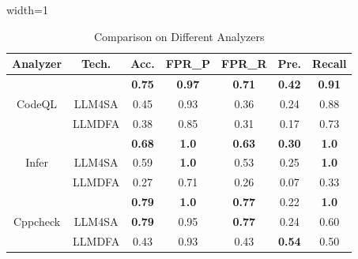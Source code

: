 \begin{table}[htb]
    \centering
    \caption{Comparison on Different Analyzers}\label{table:rq1_2}
    \footnotesize
    \begin{adjustbox}{width=1\linewidth}
        \begin{tabular}{c|c|c|c|c|c|c}
        \hline
        \textbf{Analyzer} & \textbf{Tech.} & \textbf{Acc.} &
        \textbf{FPR\_P} & \textbf{FPR\_R} &
        \textbf{Pre.} & \textbf{Recall} \\ \hline

        \multirow{3}{*}{CodeQL}& \app{} & \textbf{0.75}  & \textbf{0.97} & \textbf{0.71} &\textbf{0.42} &\textbf{0.91}  \\
        & LLM4SA & 0.45  & 0.93 &  0.36& 0.24&0.88\\
        & LLMDFA & 0.38  & 0.85 & 0.31 & 0.17& 0.73\\\hline 
        
        \multirow{3}{*}{Infer}& \app{} & \textbf{0.68 } &\textbf{1.0}  &  \textbf{0.63}& \textbf{0.30}&\textbf{1.0}  \\
        & LLM4SA & 0.59  & \textbf{1.0} & 0.53 & 0.25&\textbf{1.0}\\
        & LLMDFA & 0.27  & 0.71 & 0.26 & 0.07 & 0.33 \\\hline 

        \multirow{3}{*}{Cppcheck}& \app{} & \textbf{0.79}  & \textbf{1.0} & \textbf{0.77} & 0.22 & \textbf{1.0} \\
        & LLM4SA & \textbf{0.79}  & 0.95 &  \textbf{0.77 }& 0.24 & 0.60 \\
        & LLMDFA & 0.43  & 0.93 & 0.43 & \textbf{0.54} & 0.50\\\hline 

        \end{tabular}
    \end{adjustbox}
\end{table}